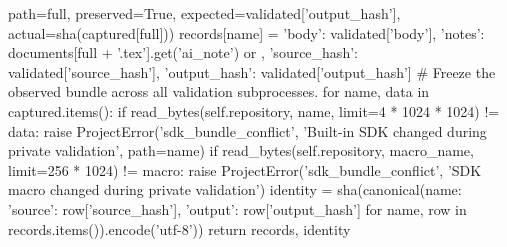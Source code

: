                                        path=full, preserved=True,
                                       expected=validated['output_hash'], actual=sha(captured[full]))
                records[name] = {'body': validated['body'], 'notes': documents[full + '.tex'].get('ai_note') or {},
                                 'source_hash': validated['source_hash'], 'output_hash': validated['output_hash']}
        # Freeze the observed bundle across all validation subprocesses.
        for name, data in captured.items():
            if read_bytes(self.repository, name, limit=4 * 1024 * 1024) != data:
                raise ProjectError('sdk_bundle_conflict', 'Built-in SDK changed during private validation', path=name)
        if read_bytes(self.repository, macro_name, limit=256 * 1024) != macro:
            raise ProjectError('sdk_bundle_conflict', 'SDK macro changed during private validation')
        identity = sha(canonical({name: {'source': row['source_hash'], 'output': row['output_hash']}
                                  for name, row in records.items()}).encode('utf-8'))
        return records, identity

